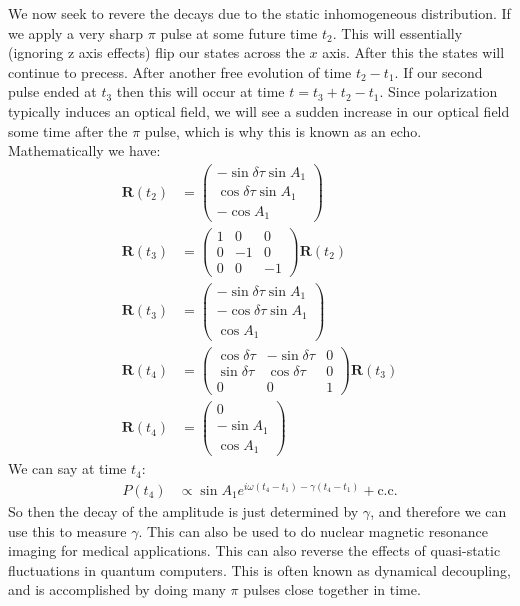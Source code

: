 We now seek to revere the decays due to the static inhomogeneous distribution. If we apply a very sharp $\pi$ pulse at some future time $t_2$. This will essentially (ignoring z axis effects) flip our states across the $x$ axis.
After this the states will continue to precess. After another free evolution of time $t_2 - t_1$. If our second pulse ended at $t_3$ then this will occur at time $t = t_3 + t_2 - t_1$.
Since polarization typically induces an optical field, we will see a sudden increase in our optical field some time after the $\pi$ pulse, which is why this is known as an echo.
Mathematically we have:
\begin{align*}
	\bm{R}(t_2) &= \begin{pmatrix}
		-\sin\delta\tau\sin A_1\\
		\cos\delta\tau\sin A_1 \\
		-\cos A_1
		       \end{pmatrix} \\
	\bm{R}(t_3) &= \begin{pmatrix}
		1 & 0 & 0 \\
		0 & -1 & 0 \\
		0 & 0 & -1
	\end{pmatrix}\bm{R}(t_2) \\
		\bm{R}(t_3) &= \begin{pmatrix}
			-\sin\delta\tau\sin A_1 \\
			-\cos\delta\tau \sin A_1 \\
			\cos A_1
			       \end{pmatrix} \\
	\bm{R}(t_4) &= \begin{pmatrix}
		\cos\delta\tau & -\sin\delta\tau & 0 \\
		\sin\delta\tau & \cos\delta\tau & 0 \\
		0 & 0 & 1
	\end{pmatrix}\bm{R}(t_3) \\
		\bm{R}(t_4) &= \begin{pmatrix}
			0 \\
			-\sin A_1 \\
			\cos A_1
			       \end{pmatrix}
\end{align*}
We can say at time $t_4$:
\begin{align*}
	P(t_4) &\propto \sin A_1 e^{i\omega (t_4 - t_1) - \gamma (t_4 - t_1)} + \text{c.c.}
\end{align*}
So then the decay of the amplitude is just determined by $\gamma$, and therefore we can use this to measure $\gamma$. This can also be used to do nuclear magnetic resonance imaging for medical applications.
This can also reverse the effects of quasi-static fluctuations in quantum computers. This is often known as dynamical decoupling, and is accomplished by doing many $\pi$ pulses close together in time.
